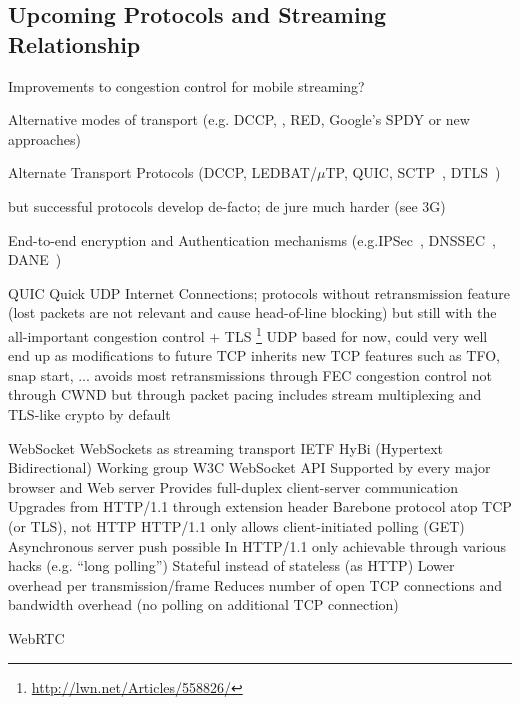 \subsection{Upcoming Protocols and Streaming Relationship}

Improvements to congestion control for mobile streaming?


 Alternative modes of transport (e.g. DCCP, , RED, Google's SPDY or new approaches)

 Alternate Transport Protocols (DCCP\cite{rfc4340}, LEDBAT\cite{rfc6817}/$\mu$TP\cite{bt2010utp}, QUIC, SCTP~\cite{rfc4960}, DTLS~\cite{rfc6347})

but successful protocols develop de-facto; de jure much harder (see \gls{3G})



 End-to-end encryption and Authentication mechanisms (e.g.IPSec~\cite{rfc4301}, DNSSEC~\cite{rfc4033}, \gls{DANE}~\cite{rfc6698})


\gls{QUIC}  Quick UDP Internet Connections; protocols without retransmission feature (lost packets are not relevant and cause head-of-line blocking) but still with the all-important congestion control + TLS
\footnote{\url{http://lwn.net/Articles/558826/}}
UDP based for now, could very well end up as modifications to future TCP
inherits new TCP features such as TFO, snap start, ...
avoids most retransmissions through FEC
congestion control not through CWND but through packet pacing
includes stream multiplexing and TLS-like crypto by default



WebSocket \cite{rfc6455}
WebSockets as streaming transport \cite{w3c2011websockets} \cite{heise2011websockets}
 IETF HyBi (Hypertext Bidirectional) Working group
 W3C WebSocket API
 Supported by every major browser and Web server
 Provides full-duplex client-server communication
	Upgrades from HTTP/1.1 through extension header
	Barebone protocol atop TCP (or TLS), not HTTP
	HTTP/1.1 only allows client-initiated polling (GET)
	Asynchronous server push possible
		In HTTP/1.1 only achievable through various hacks (e.g. ``long polling'')
		Stateful instead of stateless (as HTTP)
Lower overhead per transmission/frame
Reduces number of open TCP connections and bandwidth overhead (no polling on additional TCP connection)


WebRTC \cite{webrtcdraft}


